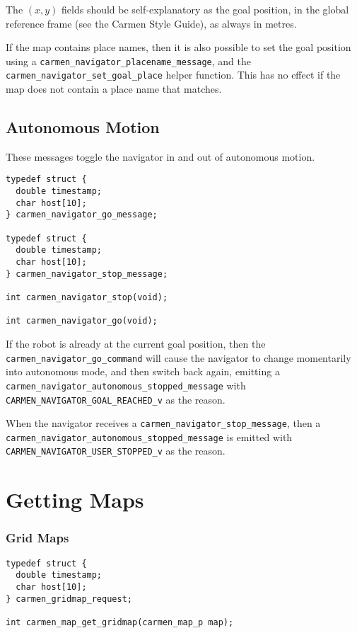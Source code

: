 \documentclass{article}
\begin{document}
The $(x, y)$ fields should be self-explanatory as the goal position, in the
global reference frame (see the Carmen Style Guide), as always in metres.

If the map contains place names, then it is also possible to set the goal
position using a \verb!carmen_navigator_placename_message!, and the
\verb!carmen_navigator_set_goal_place! helper function. This has no effect if
the map does not contain a place name that matches. 

\subsection{Autonomous Motion}

These messages toggle the navigator in and out of autonomous motion. 

\begin{verbatim}
typedef struct {
  double timestamp;
  char host[10];
} carmen_navigator_go_message;

typedef struct {
  double timestamp;
  char host[10];
} carmen_navigator_stop_message;

int carmen_navigator_stop(void);

int carmen_navigator_go(void);

\end{verbatim}

If the robot is already at the current goal position, then the
\verb!carmen_navigator_go_command! will cause the navigator to change
momentarily into autonomous mode, and then switch back again, emitting a
\verb!carmen_navigator_autonomous_stopped_message! with
\verb!CARMEN_NAVIGATOR_GOAL_REACHED_v! as the reason.

When the navigator receives a \verb!carmen_navigator_stop_message!, then a
\verb!carmen_navigator_autonomous_stopped_message! is emitted with
\verb!CARMEN_NAVIGATOR_USER_STOPPED_v! as the reason.

\section{Getting Maps}

\subsubsection{Grid Maps}

\begin{verbatim}
typedef struct {
  double timestamp;
  char host[10];
} carmen_gridmap_request;

int carmen_map_get_gridmap(carmen_map_p map);
\end{verbatim}
\end{document}
